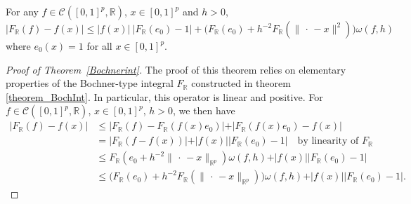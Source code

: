\documentclass[anon,12pt]{colt2021} %
\begin{document}
\begin{theorem} \citep[Theorem 6.2.3]{ApproxTheory} \label{Bochnerint}
For any $f \in \mathcal{C}([0,1]^{p}, \mathbb{R})$, $x \in [0,1]^{p}$ and $h > 0$,
\begin{equation} \label{ineq_Bochner}
    \big \vert F_{\mathbb{R}}(f) - f(x) \big \vert \leq \vert f(x) \vert \ \vert F_{\mathbb{R}}(e_{0}) - 1 \vert + \big( F_{\mathbb{R}}(e_{0}) + h^{-2}F_{\mathbb{R}}(\| \, \cdot \, - x \|^{2})\big) \omega(f,h)
\end{equation}
where $e_{0}(x) = 1$ for all $x \in [0,1]^{p}$.
\end{theorem}
\begin{proof}[{Proof of Theorem~\ref{Bochnerint}}]
The proof of this theorem relies on elementary properties of the Bochner-type integral $F_{\mathbb{R}}$ constructed in theorem \ref{theorem_BochInt}. In particular, this operator is linear and positive. For $f \in \mathcal{C}([0,1]^{p}, \mathbb{R})$, $x \in [0,1]^{p}$, $h>0$, we then have
\begin{align*}
    \vert F_{\mathbb{R}}(f) - f(x) \vert & \leq \vert F_{\mathbb{R}}(f) - F_{\mathbb{R}}(f(x)e_{0}) \vert + \vert F_{\mathbb{R}}(f(x)e_{0}) - f(x) \vert \\
    & = \vert F_{\mathbb{R}}(f - f(x)) \vert + \vert f(x) \vert \vert F_{\mathbb{R}}(e_{0}) -1 \vert \quad \text{by linearity of } F_{\mathbb{R}} \\
    & \leq F_{\mathbb{R}}(e_{0}+h^{-2} \| \, \cdot \, - x \|_{\mathbb{R}^{p}}) \omega(f, h) + \vert f(x) \vert \vert F_{\mathbb{R}}(e_{0}) -1 \vert \\
    & \leq \bigg( F_{\mathbb{R}}(e_{0}) + h^{-2}F_{\mathbb{R}}(\| \, \cdot \, - x \|_{\mathbb{R}^{p}}) \bigg)  \omega(f, h) + \vert f(x) \vert \vert F_{\mathbb{R}}(e_{0}) -1 \vert.
\end{align*}
\end{proof}
\end{document}
